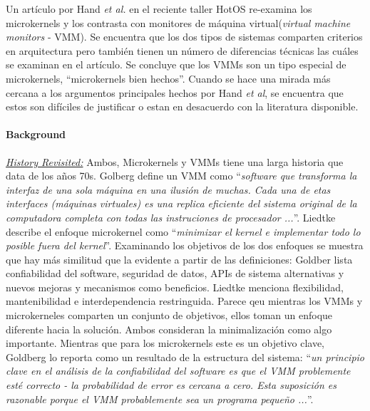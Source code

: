Un artículo por Hand \emph{et al.} en el reciente taller HotOS re-examina los microkernels y los contrasta con monitores de máquina virtual(\emph{virtual machine monitors} - VMM). Se encuentra que los dos tipos de sistemas comparten criterios en arquitectura pero también tienen un número de diferencias técnicas las cuáles se examinan en el artículo. Se concluye que los VMMs son un tipo especial de microkernels, ``microkernels bien hechos''. Cuando se hace una mirada más cercana a los argumentos principales hechos por Hand \emph{et al}, se encuentra que estos son difíciles de justificar o estan en desacuerdo con la literatura disponible.

\paragraph{\textnormal{\textbf{Background}}}
\underline{\emph{History Revisited:}} Ambos, Microkernels y VMMs tiene una larga historia que data de los años 70s. Golberg define un VMM como ``\emph{software que transforma la interfaz de una sola máquina en una ilusión de muchas. Cada una de etas interfaces (máquinas virtuales)  es una replica eficiente del sistema original de la computadora completa con todas las instruciones de procesador ...}''. Liedtke describe el enfoque microkernel como ``\emph{minimizar el kernel e implementar todo lo posible fuera del kernel}''. Examinando los objetivos de los dos enfoques se muestra que hay más similitud que la evidente a partir de las definiciones: Goldber lista confiabilidad del software, seguridad de datos, APIs de sistema alternativas y nuevos mejoras y mecanismos como beneficios. Liedtke menciona flexibilidad, mantenibilidad e interdependencia restringuida. Parece qeu mientras los VMMs y microkerneles comparten un conjunto de objetivos, ellos toman un enfoque diferente hacia la solución. Ambos consideran la minimalización como algo importante. Mientras que para los microkernels este es un objetivo clave, Goldberg lo reporta como un resultado de la estructura del sistema: ``\emph{un principio clave en el análisis de la confiabilidad del software es que el VMM problemente esté correcto - la probabilidad de error es cercana a cero. Esta suposición es razonable porque el VMM probablemente sea un programa pequeño ...}''. 

